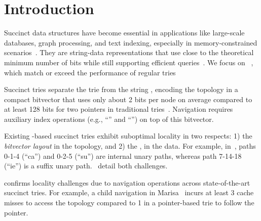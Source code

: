\section{Introduction}\label{sec:intro}

Succinct data structures have become essential in applications like large-scale
databases, graph processing, and text indexing, especially in memory-constrained
scenarios~\cite{sds_application}. They are string-data representations that use
close to the theoretical minimum number of bits while still supporting efficient
queries~\cite{sds_overview, munro2018succinct}. We focus on ~\cite{surf, pdt, coco_0, coco_1, marisa}, which match or exceed the
performance of regular tries 

Succinct tries separate the trie  from the string ,
encoding the topology in a compact bitvector that uses only about 2 bits per
node on average compared to at least 128 bits for two pointers in traditional
tries~\cite{jacobson1989space}. Navigation requires auxiliary index operations
(e.g., ``\rankop'' and ``\selectop'') on top of this bitvector.



  Existing \bv-based succinct tries exhibit suboptimal locality in two respects:
  1) the \emph{bitvector layout} in the topology, and 2) the , in the data.
  For example, in~, paths 0-1-4 (``ca'') and 0-2-5
  (``su'') are internal unary paths, whereas path 7-14-18 (``ie'') is a suffix
  unary path.~ detail both challenges.

 confirms locality challenges due to navigation
operations across state-of-the-art succinct tries. For example, a child
navigation in Marisa~\cite{marisa} incurs at least 3 cache misses to access the
topology \bv compared to 1 in a pointer-based trie to follow the pointer.



